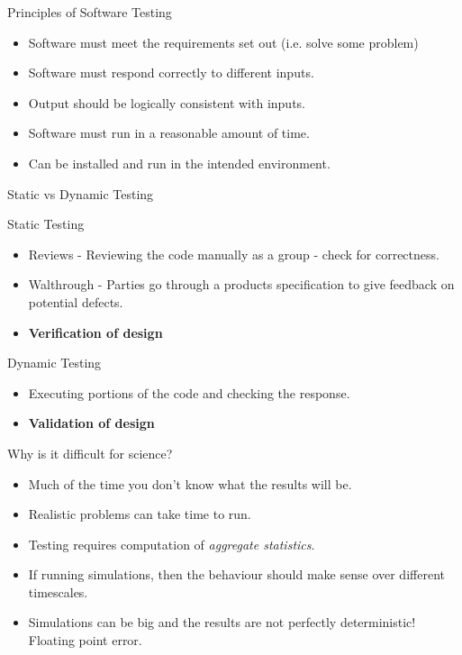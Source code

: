 \documentclass[ignorenonframetext,]{beamer}
\providecommand{\tightlist}{%
  \setlength{\itemsep}{0pt}\setlength{\parskip}{0pt}}
\begin{document}
\begin{frame}{Principles of Software Testing}

\begin{itemize}
\tightlist
\item
  Software must meet the requirements set out (i.e. solve some problem)
\item  Software must respond correctly to different inputs.
\item  Output should be logically consistent with inputs.
\item  Software must run in a reasonable amount of time.
\item  Can be installed and run in the intended environment.
\end{itemize}

\end{frame}

\begin{frame}{Static vs Dynamic Testing}

\begin{block}{Static Testing}

\begin{itemize}
\tightlist
\item
  Reviews - Reviewing the code manually as a group - check for
  correctness.
\item
  Walthrough - Parties go through a products specification to give
  feedback on potential defects.
\item
  \textbf{Verification of design}
\end{itemize}

\end{block}

\begin{block}{Dynamic Testing}

\begin{itemize}
\tightlist
\item
  Executing portions of the code and checking the response.
\item
  \textbf{Validation of design}
\end{itemize}

\end{block}

\end{frame}

\begin{frame}{Why is it difficult for science?}

\begin{itemize}
\tightlist
\item
  Much of the time you don't know what the results will be.
\item
  Realistic problems can take time to run.
\item
  Testing requires computation of \emph{aggregate statistics}.
\item  If running simulations, then the behaviour should make sense over different timescales.
\item Simulations can be big and the results are not perfectly deterministic! Floating point error.
\end{itemize}

\end{frame}
\end{document}
